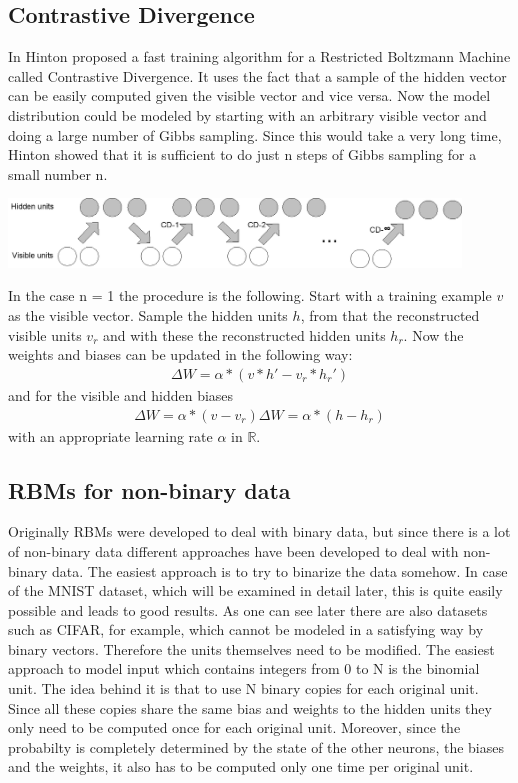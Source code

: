 \documentclass[a4paper]{scrartcl}
\newcommand{\R}{\mathbb{R}}
\begin{document}
\subsection{Contrastive Divergence}
In \cite{Hinton2} Hinton proposed a fast training algorithm for a Restricted Boltzmann Machine called Contrastive Divergence. It uses the fact that a sample of the hidden vector can be easily computed given the visible vector and vice versa. Now the model distribution could be modeled by starting with an arbitrary visible vector and doing a large number of Gibbs sampling. Since this would take a very long time, Hinton showed that it is sufficient to do just n steps of Gibbs sampling for a small number n.
\begin{center}
\includegraphics[width=12cm]{images/cd-n.png}
\end{center}
In the case n = 1 the procedure is the following. Start with a training example $v$ as the visible vector. Sample the hidden units $h$, from that the reconstructed visible units $v_r$ and with these the reconstructed hidden units $h_r$. Now the weights and biases can be updated in the following way:
\begin{align*}
\Delta W = \alpha*(v*h' - v_r*h_r')
\end{align*}
and for the visible and hidden biases
\begin{align*}
\Delta W = \alpha*(v-v_r) \Delta W = \alpha*(h-h_r)
\end{align*}
with an appropriate learning rate $\alpha$ in $\R$.

\subsection{RBMs for non-binary data}
Originally RBMs were developed to deal with binary data, but since there is a lot of non-binary data different approaches have been developed to deal with non-binary data. The easiest approach is to try to binarize the data somehow. In case of the MNIST dataset, which will be examined in detail later, this is quite easily possible and leads to good results. As one can see later there are also datasets such as CIFAR, for example, which cannot be modeled in a satisfying way by binary vectors. Therefore the units themselves need to be modified. The easiest approach to model input which contains integers from 0 to N is the binomial unit. The idea behind it is that to use N binary copies for each original unit. Since all these copies share the same bias and weights to the hidden units they only need to be computed once for each original unit. Moreover, since the probabilty is completely determined by the state of the other neurons, the biases and the weights, it also has to be computed only one time per original unit.
\end{document}
